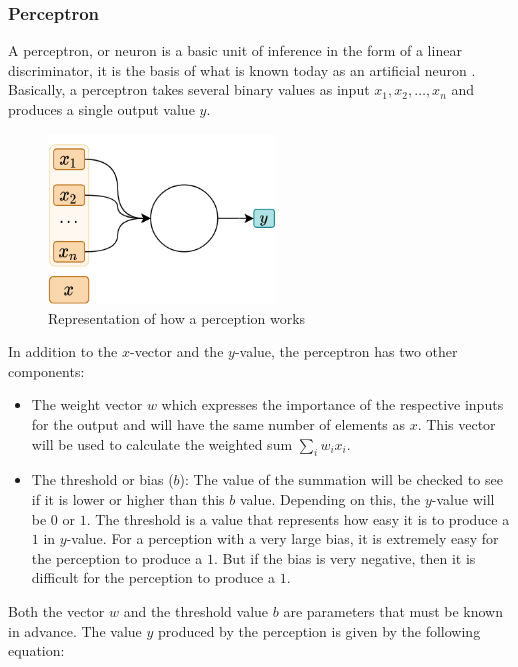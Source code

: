 \subsubsection{Perceptron}

A perceptron, or neuron is a basic unit of inference in the form of a linear discriminator, it is the basis of what is known today as an artificial neuron \cite{nielsen}. Basically, a perceptron takes several binary values as input $x_1, x_2, …, x_n$ and produces a single output value $y$.
\newline

\begin{figure}[H]
    \centering
    \includegraphics[width=6cm]{images/state-of-art/perceptron/perceptron.png}
    \caption{Representation of how a perception works}
    \label{fig:perceptronprocess}
\end{figure}

In addition to the $x$-vector and the $y$-value, the perceptron has two other components:

\begin{itemize}
    \item The weight vector $w$ which expresses the importance of the respective inputs for the output and will have the same number of elements as $x$. This vector will be used to calculate the weighted sum $\sum_i w_ix_i$.
    \item The threshold or bias ($b$): The value of the summation will be checked to see if it is lower or higher than this $b$ value. Depending on this, the $y$-value will be $0$ or $1$. The threshold is a value that represents how easy it is to produce a $1$ in $y$-value. For a perception with a very large bias, it is extremely easy for the perception to produce a $1$. But if the bias is very negative, then it is difficult for the perception to produce a $1$.
\end{itemize}


Both the vector $w$ and the threshold value $b$ are parameters that must be known in advance. The value $y$ produced by the perception is given by the following equation:

